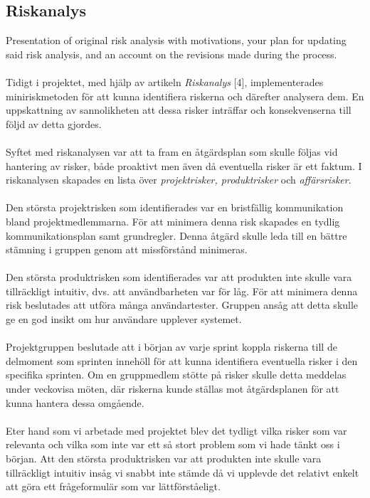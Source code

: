 \documentclass[12pt]{article}
\begin{document}
\subsection{Riskanalys}
Presentation of original risk analysis with motivations, your plan for updating said risk analysis, and an account on the revisions made during the process. \\\\
 Tidigt i projektet, med hjälp av artikeln \textit{Riskanalys} [4], implementerades miniriskmetoden för att kunna identifiera riskerna och därefter analysera dem. En uppskattning av sannolikheten att dessa risker inträffar och konsekvenserna till följd av detta gjordes.\\\\
 Syftet med riskanalysen var att ta fram en åtgärdsplan som skulle följas vid hantering av risker, både proaktivt men även då eventuella risker är ett faktum. I riskanalysen skapades en lista över \textit{projektrisker, produktrisker} och \textit{affärsrisker}.\\\\
 Den största projektrisken som identifierades var en bristfällig kommunikation bland projektmedlemmarna. För att minimera denna risk skapades en tydlig kommunikationsplan samt grundregler. Denna åtgärd skulle leda till en bättre stämning i gruppen genom att missförstånd minimeras.\\\\
 Den största produktrisken som identifierades var att produkten inte skulle vara tillräckligt intuitiv, dvs. att användbarheten var för låg. För att minimera denna risk beslutades att utföra många användartester. Gruppen ansåg att detta skulle ge en god insikt om hur användare upplever systemet.\\\\
 Projektgruppen beslutade att i början av varje sprint koppla riskerna till de delmoment som sprinten innehöll för att kunna identifiera eventuella risker i den specifika sprinten. Om en gruppmedlem stötte på risker skulle detta meddelas under veckovisa möten, där riskerna kunde ställas mot åtgärdsplanen för att kunna hantera dessa omgående.\\\\
 Eter hand som vi arbetade med projektet blev det tydligt vilka risker som var relevanta och vilka som inte var ett så stort problem som vi hade tänkt oss i början. Att den största produktrisken var att produkten inte skulle vara tillräckligt intuitiv insåg vi snabbt inte stämde då vi upplevde det relativt enkelt att göra ett frågeformulär som var lättförståeligt.\\\\
\end{document}
